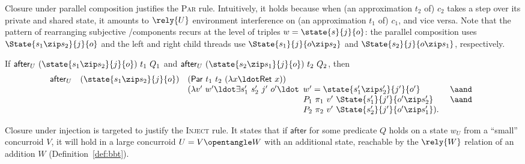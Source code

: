 Closure under parallel composition justifies the \textsc{Par}
rule. 
%
Intuitively, it holds because when (an approximation $t_2$ of) $c_2$
takes a step over its private and shared state, it amounts to
$\rely{U}$ environment interference on (an approximation $t_1$ of)
$c_1$, and vice versa. Note that the pattern of rearranging subjective
\self/\other components recurs at the level of triples $w =
\state{s}{j}{o}$: the parallel composition uses $\State{s_1 \zip
  s_2}{j}{o}$ and the left and right child threads use
$\State{s_1}{j}{o \zip s_2}$ and $\State{s_2}{j}{o \zip s_1}$,
respectively.


\begin{lemma}
\label{lm:aft-par}
If $\mathsf{after}_U~(\state{s_1 \zip s_2}{j}{o})~t_1~Q_1$ and 
$\mathsf{after}_U~(\state{s_2 \zip s_1}{j}{o})~t_2~Q_2$, then 
\[
\begin{array}{rrl}
\mathsf{after}_U & (\state{s_1 \zip s_2}{j}{o}) &
(\mathsf{Par}~t_1~t_2~(\lambda x\ldot \mathsf{Ret}~x)) 
\\ & &
(\lambda v'~w'\ldot \exists s_1'~s_2'~j'~o' \ldot  
\begin{array}[t]{ll}
w' = \state{s_1' \zip s_2'}{j'}{o'} & ~\aand \\ 
P_1~\pi_1~v'~\State{s_1' }{j'}{o' \zip s_2'} & ~\aand \\ 
P_2~\pi_2~v'~\State{s_2' }{j'}{o' \zip s_1'} ).
\end{array}

\end{array}
\]
\end{lemma}

Closure under injection is targeted to justify the \textsc{Inject}
rule. It states that if $\mathsf{after}$ for some predicate $Q$ holds
on a state $w_U$ from a ``small'' concurroid $V$, it will hold in a
large concurroid $U = V \opentangle W$ with an additional state,
reachable by the $\rely{W}$ relation of an addition $W$
(Definition~\ref{def:bbt}).



